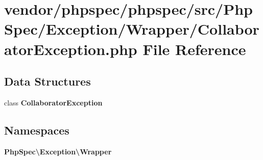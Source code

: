 \section{vendor/phpspec/phpspec/src/\+Php\+Spec/\+Exception/\+Wrapper/\+Collaborator\+Exception.php File Reference}
\label{_collaborator_exception_8php}
\subsection*{Data Structures}
\begin{DoxyCompactItemize}
\item 
class {\bf Collaborator\+Exception}
\end{DoxyCompactItemize}
\subsection*{Namespaces}
\begin{DoxyCompactItemize}
\item 
 {\bf Php\+Spec\textbackslash{}\+Exception\textbackslash{}\+Wrapper}
\end{DoxyCompactItemize}
